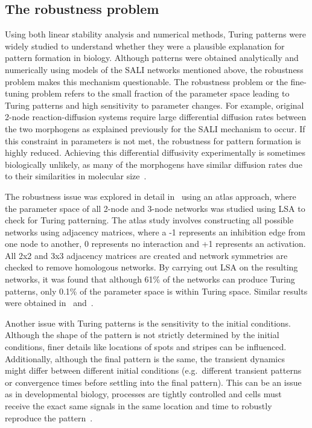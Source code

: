 \subsection{The robustness problem}

Using both linear stability analysis and numerical methods, Turing patterns were widely studied to understand whether they were a plausible explanation for pattern formation in biology.
Although patterns were obtained analytically and numerically using models of the SALI networks mentioned above, the robustness problem makes this mechanism questionable.
The robustness problem or the fine-tuning problem refers to the small fraction of the parameter space leading to Turing patterns and high sensitivity to parameter changes.
For example, original 2-node reaction-diffusion systems require large differential diffusion rates between the two morphogens as explained previously for the SALI mechanism to occur.
If this constraint in parameters is not met, the robustness for pattern formation is highly reduced.
Achieving this differential diffusivity experimentally is sometimes biologically unlikely, as many of the morphogens have similar diffusion rates due to their similarities in molecular size~\parencite{oliverhuidobro}.

The robustness issue was explored in detail in~\cite{Scholes2019} using an atlas approach, where the parameter space of all 2-node and 3-node networks was studied using LSA to check for Turing patterning.
The atlas study involves constructing all possible networks using adjacency matrices, where a -1 represents an inhibition edge from one node to another, 0 represents no interaction and +1 represents an activation.
All 2x2 and 3x3 adjacency matrices are created and network symmetries are checked to remove homologous networks.
By carrying out LSA on the resulting networks, it was found that although 61\% of the networks can produce Turing patterns, only 0.1\% of the parameter space is within Turing space.
Similar results were obtained in~\cite{Zheng2016} and~\cite{Marcon}.


Another issue with Turing patterns is the sensitivity to the initial conditions.
Although the shape of the pattern is not strictly determined by the initial conditions, finer details like locations of spots and stripes can be influenced.
Additionally, although the final pattern is the same, the transient dynamics might differ between different initial conditions (e.g.~different transient patterns or convergence times before settling into the final pattern).
This can be an issue as in developmental biology, processes are tightly controlled and cells must receive the exact same signals in the same location and time to robustly reproduce the pattern~\parencite{perrimon2012signaling}.



